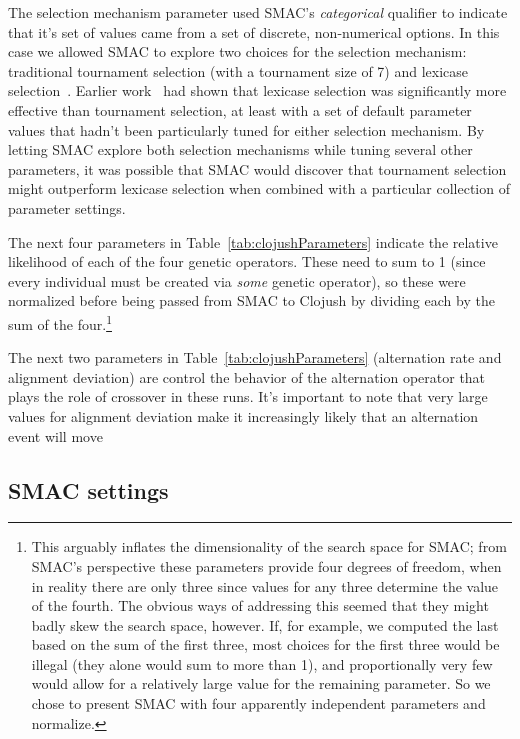 \documentclass{llncs}
\begin{document}
The selection mechanism parameter used SMAC's \emph{categorical} qualifier to
indicate that it's set of values came from a set of discrete, non-numerical
options. In this case we allowed SMAC to explore two choices for the selection
mechanism: traditional tournament selection (with a tournament size of 7) and
lexicase selection~\cite{lexicase:things}. Earlier 
work~\cite{Helmuth:GECCO:2015} had shown that lexicase selection was
significantly more effective than tournament selection, at least with a set of 
default parameter values that hadn't been particularly tuned for either
selection mechanism. By letting SMAC explore both selection mechanisms while
tuning several other parameters, it was possible that SMAC would discover
that tournament selection might outperform lexicase selection when combined
with a particular collection of parameter settings.

The next four parameters in Table~\ref{tab:clojushParameters} indicate the
relative likelihood of each of the four genetic operators. These need to sum
to 1 (since every individual must be created via \emph{some} genetic operator),
so these were normalized before being passed from SMAC to Clojush by dividing
each by the sum of the four.\footnote{This arguably inflates the dimensionality of the
search space for SMAC; from SMAC's perspective these parameters provide four
degrees of freedom, when in reality there are only three since values for any
three determine the value of the fourth. The obvious ways of addressing this
seemed that they might badly skew the search space, however. If, for example,
we computed the last based on the sum of the first three, most choices for the
first three would be illegal (they alone would sum to more than 1), and
proportionally very few would allow for a relatively large value for the
remaining parameter. So we chose to present SMAC with four apparently 
independent parameters and normalize.}

The next two parameters in Table~\ref{tab:clojushParameters} (alternation
rate and alignment deviation) are control the behavior of the alternation
operator that plays the role of crossover in these runs. It's important to
note that very large values for alignment deviation make it increasingly
likely that an alternation event will move 

\subsection{SMAC settings}
\label{sec:SMACsettings}
\end{document}
